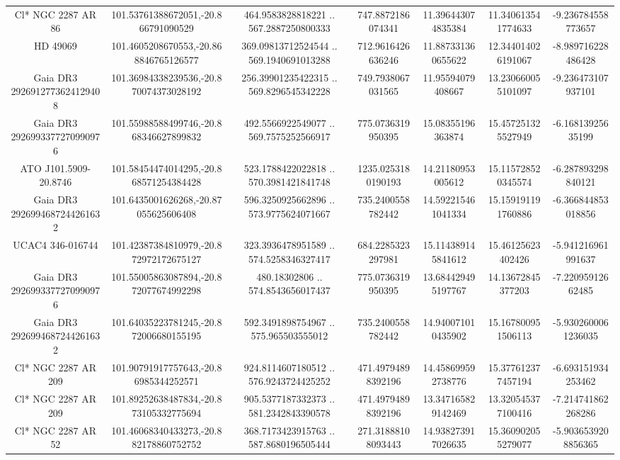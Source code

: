 \begin{table}
\begin{tabular}{ccccccc}
Cl* NGC 2287     AR      86 & 101.53761388672051,-20.866791090529 & 464.9583828818221 .. 567.2887250800333 & 747.8872186074341 & 11.396443074835384 & 11.340613541774633 & -9.236784558773657 \\
HD  49069 & 101.4605208670553,-20.868846765126577 & 369.09813712524544 .. 569.1940691013288 & 712.9616426636246 & 11.887331360655622 & 12.344014026191067 & -8.989716228486428 \\
Gaia DR3 2926912773624129408 & 101.36984338239536,-20.870074373028192 & 256.39901235422315 .. 569.8296545342228 & 749.7938067031565 & 11.95594079408667 & 13.230660055101097 & -9.236473107937101 \\
Gaia DR3 2926993377270990976 & 101.55988588499746,-20.868346627899832 & 492.5566922549077 .. 569.7575252566917 & 775.0736319950395 & 15.08355196363874 & 15.457251325527949 & -6.16813925635199 \\
ATO J101.5909-20.8746 & 101.58454474014295,-20.868571254384428 & 523.1788422022818 .. 570.3981421841748 & 1235.0253180190193 & 14.21180953005612 & 15.115728520345574 & -6.287893298840121 \\
Gaia DR3 2926994687244261632 & 101.6435001626268,-20.87055625606408 & 596.3250925662896 .. 573.9775624071667 & 735.2400558782442 & 14.592215461041334 & 15.159191191760886 & -6.366844853018856 \\
UCAC4 346-016744 & 101.42387384810979,-20.872972172675127 & 323.3936478951589 .. 574.5258346327417 & 684.2285323297981 & 15.114389145841612 & 15.46125623402426 & -5.941216961991637 \\
Gaia DR3 2926993377270990976 & 101.55005863087894,-20.872077674992298 & 480.18302806 .. 574.8543656017437 & 775.0736319950395 & 13.684429495197767 & 14.13672845377203 & -7.22095912662485 \\
Gaia DR3 2926994687244261632 & 101.64035223781245,-20.872006680155195 & 592.3491898754967 .. 575.965503555012 & 735.2400558782442 & 14.940071010435902 & 15.167800951506113 & -5.9302600061236035 \\
Cl* NGC 2287     AR     209 & 101.90791917757643,-20.86985344252571 & 924.8114607180512 .. 576.9243724425252 & 471.49794898392196 & 14.458699592738776 & 15.377612377457194 & -6.693151934253462 \\
Cl* NGC 2287     AR     209 & 101.89252638487834,-20.873105332775694 & 905.5377187332373 .. 581.2342843390578 & 471.49794898392196 & 13.347165829142469 & 13.320545377100416 & -7.214741862268286 \\
Cl* NGC 2287     AR      52 & 101.46068340433273,-20.882178860752752 & 368.7173423915763 .. 587.8680196505444 & 271.31888108093443 & 14.938273917026635 & 15.360902055279077 & -5.9036539208856365 \\

\end{tabular}
\end{table}
